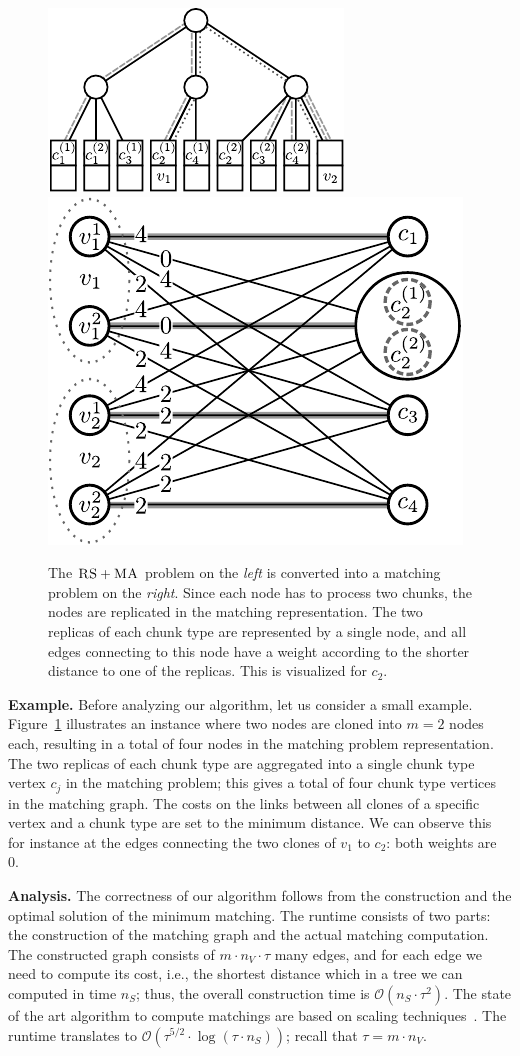 \documentclass[conference,10pt]{IEEEtran}
\newcommand{\MaFactor}{m}
\newcommand{\ChunkType}{\tau}
\newcommand{\VirtualNode}{v}
\newcommand{\achunk}{\ensuremath{c}}
\newcommand{\RS}{\textsc{RS}}
\newcommand{\MA}{\textsc{MA}}
\begin{document}
\begin{figure}
\includegraphics[width = 0.49\columnwidth]{figs/model_ma_r_cv_boxes}
\hfill
\includegraphics[width =0.49\columnwidth]{figs/matching}
\caption{The $\RS+\MA$ problem on the \emph{left} is converted into a
matching problem on the \emph{right}. Since each node has to process two
chunks, the
nodes are replicated in the matching representation. The two replicas of each
chunk type are represented by a single node, and all edges connecting to this
node have a weight according to the shorter distance to one of the replicas.
This is visualized for $\achunk_2$.}
\label{fig:matching}
\end{figure}

\textbf{Example.} Before analyzing our algorithm, let us consider a small example.
Figure~\ref{fig:matching} illustrates
an instance where two nodes are
cloned into $\MaFactor = 2$ nodes each,
resulting in a total of four nodes in
the matching problem representation.
The two replicas of each chunk type are
aggregated into a single chunk type vertex $\achunk_j$  in the matching problem;
this gives a total of four chunk type vertices in the matching graph. The costs
on the links between all clones of a specific vertex and a chunk type are set to
the minimum distance. We can observe this for instance at the edges connecting
the two clones of $\VirtualNode_1$ to $\achunk_2$: both weights are 0.

\textbf{Analysis.}
The correctness of our algorithm follows from the construction and the optimal
solution of the minimum matching.
The runtime consists of two parts: the construction of the matching graph and
the actual matching computation. The constructed graph consists of
$\MaFactor \cdot n_V \cdot \ChunkType$
many edges,
and for each edge we need to compute its cost, i.e., the shortest distance
which in a tree we can computed in time $n_S$; thus, the overall construction time
is
$\mathcal{O}(n_S \cdot \tau^2)$.
The state of the art algorithm to compute matchings are based on scaling techniques~\cite{scale-match}.
The runtime translates to
$\mathcal{O}(\tau^{5/2}\cdot \log(\tau\cdot n_S))$; recall that $\tau = \MaFactor\cdot n_V$.
\end{document}
